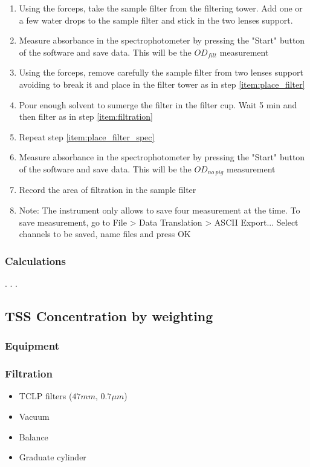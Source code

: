 \documentclass[]{spie}  %
\begin{document}
\begin{enumerate}
  \item \label{item:place_filter_spec} Using the forceps, take the sample filter from the filtering tower. Add one or a few water drops to the sample filter and stick in the two lenses support. 
  \item  Measure absorbance in the spectrophotometer by pressing the "Start" button of the software and save data. This will be the $OD_{filt}$ measurement
  \item Using the forceps, remove carefully the sample filter from two lenses support avoiding to break it and place in the filter tower as in step \ref{item:place_filter}
  \item Pour enough solvent {\color{red} to sumerge} the filter in the filter cup. {\color{red} Wait 5 min} and then filter as in step \ref{item:filtration}
  \item Repeat step \ref{item:place_filter_spec}
  \item Measure absorbance in the spectrophotometer by pressing the "Start" button of the software and save data. This will be the $OD_{no~pig}$ measurement 
  \item Record the area of filtration in the sample filter
  \item[]Note: The instrument only allows to save four measurement at the time. To save measurement, go to File > Data Translation > ASCII Export... {\color{red} Select channels to be saved, name files and press OK}
\end{enumerate}
\subsubsection{Calculations}
.
.
.
\subsection{TSS Concentration by weighting}
\subsubsection{Equipment}
\subsubsection*{Filtration}
\begin{itemize}

  \item TCLP filters ($47 mm$, $0.7\mu m$)
  \item Vacuum
  \item Balance
  \item Graduate cylinder

\end{itemize}
\end{document}
